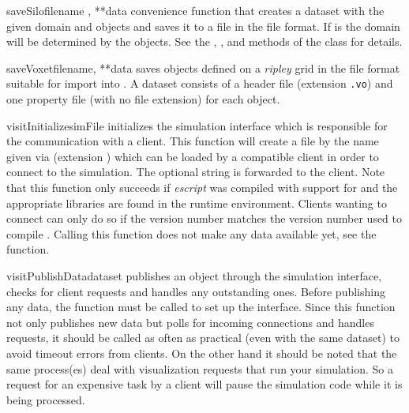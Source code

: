 \begin{funcdesc}{saveSilo}{filename , **data}
    convenience function that creates a dataset with the given domain and \Data
    objects and saves it to a file in the \SILO file format.
    If  is  the domain will be determined by the \Data
    objects.
    See the , , and 
    methods of the  class for details.
\end{funcdesc}

\begin{funcdesc}{saveVoxet}{filename, **data}
    saves \Data objects defined on a {\it ripley} grid in the \Voxet file
    format suitable for import into \GOCAD\cite{GOCAD}.
    A \Voxet dataset consists of a header file (extension \verb|.vo|) and
    one property file (with no file extension) for each \Data object.
\end{funcdesc}

\begin{funcdesc}{visitInitialize}{simFile }
    initializes the \VisIt simulation interface which is responsible for the
    communication with a \VisIt client.
    This function will create a file by the name given via 
    (extension ) which can be loaded by a compatible \VisIt client
    in order to connect to the simulation. The optional  string
    is forwarded to the client.
    Note that this function only succeeds if {\it escript} was compiled with
    support for \VisIt and the appropriate libraries are found in the runtime
    environment. Clients wanting to connect can only do so if the version
    number matches the version number used to compile \weipa.
    Calling this function does not make any data available yet, see the
     function.
\end{funcdesc}

\begin{funcdesc}{visitPublishData}{dataset}
    publishes an  object through the \VisIt simulation
    interface, checks for client requests and handles any outstanding ones.
    Before publishing any data, the  function must be
    called to set up the interface.
    Since this function not only publishes new data but polls for incoming
    connections and handles requests, it should be called as often as practical
    (even with the same dataset) to avoid timeout errors from clients.
    On the other hand it should be noted that the same process(es) deal with
    visualization requests that run your simulation. So a request for an
    expensive task by a \VisIt client will pause the simulation code while it
    is being processed.
\end{funcdesc}

